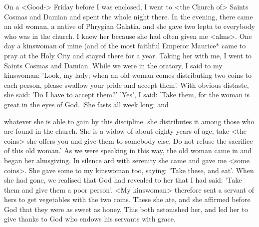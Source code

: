 On a <Good-> Friday before I was enclosed, I went to <the Church
of> Saints Cosmas and Damian and spent the whole night there.
In
the evening, there came an old woman, a native of Phrygian
Galatia, and she gave two lepta to everybody who was in the
church.
I knew her because she had often given me <alms>.
One
day a kinswoman of mine (and of the most faithful Emperor
Maurice* came to pray at the Holy City and stayed there for a year.
Taking her with me, I went to Saints Cosmas and Damian.
While
we were in the oratory, I said to my kinswoman: 'Look, my lady;
when an old woman comes distributing two coins to each person,
please swallow your pride and accept them'.
With obvious distaste,
she said: 'Do I have to accept them?' 'Yes', I said: 'Take them, for
the woman is great in the eyes of God.
[She fasts all week long; and

whatever she is able to gain by this discipline] she distributes it
among those who are found in the church.
She is a widow of about
eighty years of age; take <the coins> she offers you and give them
to somebody else, Do not refuse the sacrifice of this old woman.' As
we were speaking in this way, the old woman came in and began
her almsgiving.
In silence ard with serenity she came and gave me
<some coins>.
She gave some to my kinswoman too, saying: 'Take
these, and eat'.
When she had gone, we realised that God had
revealed to her that I had said: 'Take them and give them a poor
person'.
<My kinswoman> therefore sent a servant of hers to get
vegetables with the two coins.
These she ate, and she affirmed
before God that they were as sweet as honey.
This both astonished
her, and led her to give thanks to God who endows his servants
with grace.

